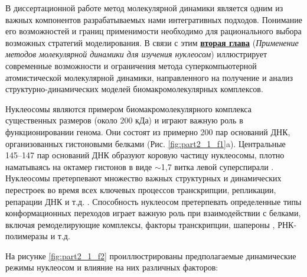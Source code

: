 

В диссертационной работе метод молекулярной динамики является одним из важных компонентов разрабатываемых нами интегративных подходов. Понимание его возможностей и границ применимости необходимо для рационального выбора возможных стратегий моделирования. В связи с этим \underline{\textbf{вторая глава}} (\textit{Применение методов молекулярной динамики для изучения нуклеосом}) иллюстрирует современные возможности и ограничения метода суперкомпьютерной атомистической молекулярной динамики, направленного на получение и анализ структурно-динамических моделей биомакромолекулярных комплексов.

Нуклеосомы являются примером биомакромолекулярного комплекса существенных размеров (около 200 кДа) и играют важную роль в функционировании генома. Они состоят из примерно 200 пар оснований ДНК, организованных гистоновыми белками (Рис. \ref{fig:part2_1_f1}a). Центральные 145–147 пар оснований ДНК образуют коровую частицу нуклеосомы, плотно наматываясь на октамер гистонов в виде $\sim$1,7 витка левой суперспирали \cite{luger_crystal_1997,shaytan_nucleosome_2015,draizen_histonedb_2016}. Нуклеосомы претерпевают множество важных структурных и динамических перестроек во время всех ключевых процессов транскрипции, репликации, репарации ДНК и т.д. \cite{armeev_linking_2019}. Способность нуклеосом претерпевать определенные типы конформационных переходов играет важную роль при взаимодействии с белками, включая ремоделирующие комплексы, факторы транскрипции, шапероны \cite{valieva_large-scale_2016}, РНК-полимеразы \cite{gaykalova_structural_2015} и т.д.

  На рисунке \ref{fig:part2_1_f2}  проиллюстрированы предполагаемые динамические режимы нуклеосом и влияние на них различных факторов: 

